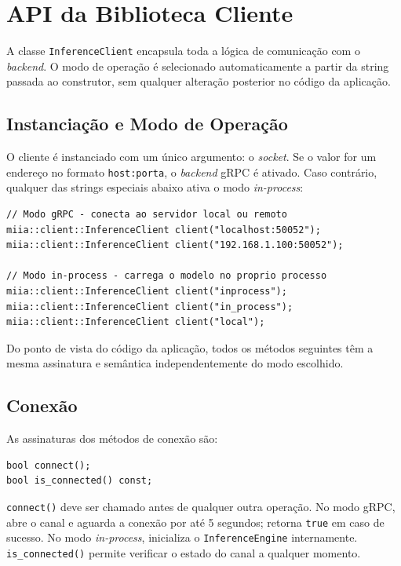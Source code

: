 \section{API da Biblioteca Cliente}

A classe \texttt{InferenceClient} encapsula toda a lógica de comunicação com o \textit{backend}. O modo de operação é selecionado automaticamente a partir da string passada ao construtor, sem qualquer alteração posterior no código da aplicação.

\subsection{Instanciação e Modo de Operação}

O cliente é instanciado com um único argumento: o \textit{socket}. Se o valor for um endereço no formato \texttt{host:porta}, o \textit{backend} gRPC é ativado. Caso contrário, qualquer das strings especiais abaixo ativa o modo \textit{in-process}:

\begin{lstlisting}[style=vscode]
// Modo gRPC - conecta ao servidor local ou remoto
miia::client::InferenceClient client("localhost:50052");
miia::client::InferenceClient client("192.168.1.100:50052");

// Modo in-process - carrega o modelo no proprio processo
miia::client::InferenceClient client("inprocess");
miia::client::InferenceClient client("in_process");
miia::client::InferenceClient client("local");
\end{lstlisting}

Do ponto de vista do código da aplicação, todos os métodos seguintes têm a mesma assinatura e semântica independentemente do modo escolhido.

\subsection{Conexão}

As assinaturas dos métodos de conexão são:

\begin{lstlisting}[style=vscode]
bool connect();
bool is_connected() const;
\end{lstlisting}

\texttt{connect()} deve ser chamado antes de qualquer outra operação. No modo gRPC, abre o canal e aguarda a conexão por até 5 segundos; retorna \texttt{true} em caso de sucesso. No modo \textit{in-process}, inicializa o \texttt{InferenceEngine} internamente. \texttt{is\_connected()} permite verificar o estado do canal a qualquer momento.

